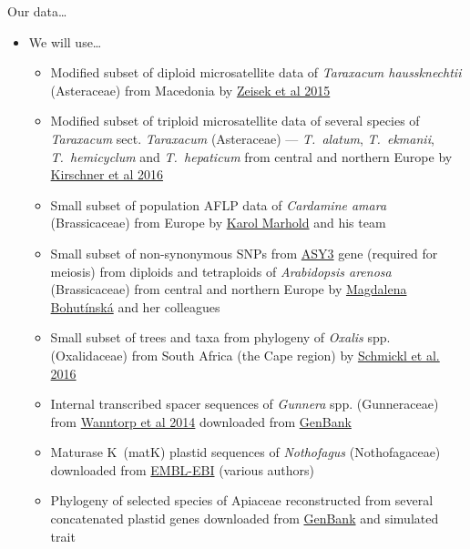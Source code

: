 \documentclass[compress, ucs, xelatex, 11pt, xcolor=svgnames, aspectratio=169,
	hyperref={
		bookmarks=true,
		unicode=true,
		colorlinks=true,
		pdftitle={Molecular data in R},
		plainpages=false,
		pdfauthor={Vojtech Zeisek},
		pdfsubject={Course about phylogeny and evolution in R},
		pdfcreator={XeLaTeX},
		pdfkeywords={R, evolution, phylogeny, molecular data},
		linkcolor=Crimson, %
		anchorcolor=Magenta, %
		citecolor=Magenta, %
		filecolor=Magenta, %
		menucolor=Magenta, %
		urlcolor=DodgerBlue, %
		pdftex},
	url={hyphens, lowtilde} %
	]{beamer}
\begin{document}
\begin{frame}[allowframebreaks]{Our data\ldots}
	\begin{itemize}
		\item We will use\ldots
		\begin{itemize}
			\item Modified subset of diploid microsatellite data of \textit{Taraxacum haussknechtii} (Asteraceae) from Macedonia by \href{https://trapa.cz/en/taraxacum-section-dioszegia}{Zeisek et al 2015}
			\item Modified subset of triploid microsatellite data of several species of \textit{Taraxacum} sect. \textit{Taraxacum} (Asteraceae) --- \textit{T.~alatum}, \textit{T.~ekmanii}, \textit{T.~hemicyclum} and \textit{T.~hepaticum} from central and northern Europe by \href{https://trapa.cz/en/identif-oligoclonal-agamospermous-microsp}{Kirschner et al 2016}
			\item Small subset of population AFLP data of \textit{Cardamine amara} (Brassicaceae) from Europe by \href{https://botany.natur.cuni.cz/brassiploidy/marhold}{Karol Marhold} and his team
			\item Small subset of non-synonymous SNPs from \href{https://www.arabidopsis.org/servlets/TairObject?type=locus&name=At2g46980}{ASY3} gene (required for meiosis) from diploids and tetraploids of \textit{Arabidopsis arenosa} (Brassicaceae) from central and northern Europe by \href{https://botany.natur.cuni.cz/ecolgen/people}{Magdalena Bohutínská} and her colleagues
			\item Small subset of trees and taxa from phylogeny of \textit{Oxalis} spp. (Oxalidaceae) from South Africa (the Cape region) by \href{https://onlinelibrary.wiley.com/doi/full/10.1111/1755-0998.12487}{Schmickl et al. 2016}
			\item Internal transcribed spacer sequences of \textit{Gunnera} spp. (Gunneraceae) from \href{https://bioone.org/journals/systematic-botany/volume-27/issue-3/0363-6445-27.3.512/Phylogenetic-Relationships-of-Gunnera-based-on-Nuclear-Ribosomal-DNA-ITS/10.1043/0363-6445-27.3.512.full}{Wanntorp et al 2014} downloaded from \href{https://www.ncbi.nlm.nih.gov/popset/22854787}{GenBank}
			\item Maturase K~(matK) plastid sequences of \textit{Nothofagus} (Nothofagaceae) downloaded from \href{https://www.ebi.ac.uk/}{EMBL-EBI} (various authors)
			\item Phylogeny of selected species of Apiaceae reconstructed from several concatenated plastid genes downloaded from \href{https://www.ncbi.nlm.nih.gov/}{GenBank} and simulated trait

\end{itemize}
\end{itemize}
\end{frame}
\end{document}

